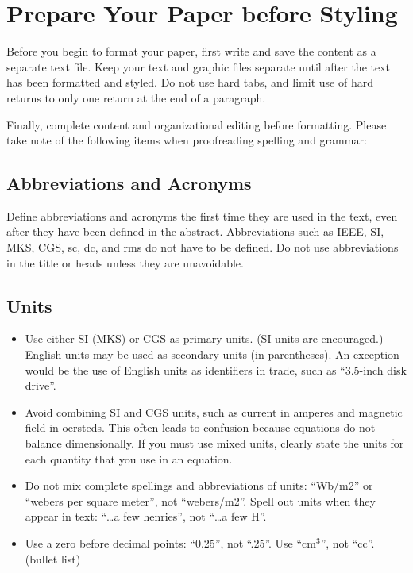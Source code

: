 \documentclass[a4paper, 10pt, conference]{ieeeconf}      %
\begin{document}
\section{Prepare Your Paper before Styling}

Before you begin to format your paper, first write and save the content as a separate text file. Keep your text and graphic files separate until after the text has been formatted and styled. Do not use hard tabs, and limit use of hard returns to only one return at the end of a paragraph. 

Finally, complete content and organizational editing before formatting. Please take note of the following items when proofreading spelling and grammar:

\subsection{Abbreviations and Acronyms} Define abbreviations and acronyms the first time they are used in the text, even after they have been defined in the abstract. Abbreviations such as IEEE, SI, MKS, CGS, sc, dc, and rms do not have to be defined. Do not use abbreviations in the title or heads unless they are unavoidable.

\subsection{Units}

\begin{itemize}

\item Use either SI (MKS) or CGS as primary units. (SI units are encouraged.) English units may be used as secondary units (in parentheses). An exception would be the use of English units as identifiers in trade, such as ``3.5-inch disk drive''.
\item Avoid combining SI and CGS units, such as current in amperes and magnetic field in oersteds. This often leads to confusion because equations do not balance dimensionally. If you must use mixed units, clearly state the units for each quantity that you use in an equation.
\item Do not mix complete spellings and abbreviations of units: ``Wb/m2'' or ``webers per square meter'', not ``webers/m2''.  Spell out units when they appear in text: ``\ldots a few henries'', not ``\ldots a few H''.
\item Use a zero before decimal points: ``0.25'', not ``.25''. Use ``cm$^3$'', not ``cc''. (bullet list)

\end{itemize}
\end{document}
